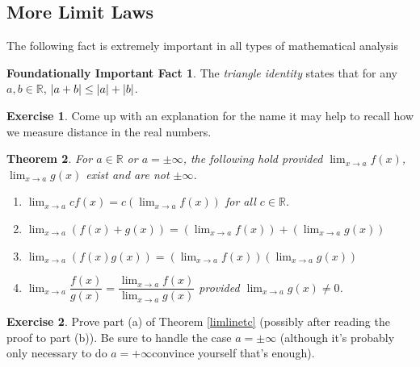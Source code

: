 \documentclass[english]{book}
\DeclarePairedDelimiter\abs{\lvert}{\rvert}%
\newcommand{\RR}{\mathbb{R}}
\newtheorem{theorem}{Theorem}[section]
\theoremstyle{remark}
\theoremstyle{definition}
\newtheorem{excs}{Exercise}
\newtheorem*{next week}{Next Week}
\newtheorem{fifact}[theorem]{Foundationally Important Fact}
\newcommand{\dlim}{\displaystyle\lim}
\begin{document}
\subsection{More Limit Laws}The following fact is extremely important in all types of mathematical analysis
\begin{fifact}\label{trident}
The \emph{triangle identity} states that for any $a,b \in \RR$, $\abs{a+b}\leq \abs{a}+\abs{b}$.
\end{fifact}
\begin{excs}
	Come up with an explanation for the name \textemdash it may help to recall how we measure distance in the real numbers.
\end{excs}
\begin{theorem}
	For $a\in \RR$ or $a=\pm \infty$, the following hold provided $\dlim_{x\to a}f(x)$, $\dlim_{x\to a} g(x)$ exist and are not $\pm \infty$. 
	\begin{enumerate}[label=(\alph*)]\label{limlinetc}
\item $\dlim_{x\to a}cf(x)=c\left(\dlim_{x\to a}f(x)\right)$ for all $c\in \RR$. 
\item $\dlim_{x\to a}\left(f(x)+g(x)\right)=\left(\dlim_{x\to a}f(x)\right)+\left(\dlim_{x\to a}g(x)\right)$
\item $\dlim_{x\to a} \left(f(x)g(x)\right)=\left(\dlim_{x\to a}f(x)\right)\left(\dlim_{x\to a}g(x)\right)$
\item $\dlim_{x\to a}\dfrac{f(x)}{g(x)}=\dfrac{\dlim_{x\to a} f(x)}{\dlim_{x\to a}g(x)}$ provided $\dlim_{x\to a}g(x)\neq 0$.
	\end{enumerate}\end{theorem}
\begin{excs}
	Prove part (a) of Theorem \ref{limlinetc} (possibly after reading the proof to part (b)). Be sure to handle the case $a=\pm \infty$ (although it's probably only necessary to do $a=+\infty$\textemdash convince yourself that's enough).
\end{excs}
\end{document}
